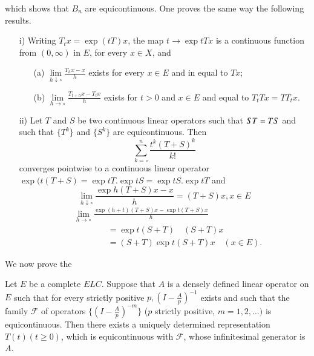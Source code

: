 which shows that $B_n$ are equicontinuous. One proves the same way the
following results. 
\begin{itemize}
\item [i)] Writing $T_tx=\exp (tT)x$, the map $t\to\exp tTx$ is a
  continuous function from $(0, \infty)$ in $E$, for every $x\in X$,
  and 
\begin{itemize}
\item [(a)] $\lim\limits_{h\downarrow\circ}\frac{T_hx-x}{h}$ exists
  for every $x\in E$ and in equal to $Tx$; 
\item [(b)] $\lim\limits_{h\to\circ}\frac{T_{t+h}x-T_tx}{h}$ exists for
  $t>0$ and $x\in E$ and equal to $T_tT x=TT_tx$.
\end{itemize}
\item [ii)] Let $T$ and $S$ be two continuous linear operators such
  that $ST=\break TS$ and such that $\{T^k\}$ and $\{S^k\}$ are
  equicontinuous. Then 
  $$\sum\limits_{k=\circ}^n \frac{t^k(T+S)^k}{k!}$$
  converges pointwise to a continuous linear operator $\exp (t(T+S)=
  \exp t T. \exp t S= \exp t S. \exp t T$ and 
$$
\lim\limits_{h\downarrow\circ}\frac{\exp h(T+S)x-x}{h}=(T+S)x, x\in E
$$\pageoriginale
\begin{align*}
&\lim\limits_{h\to\circ} \frac{\exp (h+t)(T+S)x-\exp t(T+S)x}{h}\\
&\qquad\qquad=\exp  t(S+T)\quad(S+T)x\\
&\qquad\qquad= (S+T)\exp t(S+T)x \quad (x\in E).
\end{align*}
\end{itemize}
We now prove the

 Let $E$ be a complete $E L
C$. Suppose that $A$ is a densely defined linear operator on $E$ such
that for every strictly positive $p,(I-\frac{A}{p})^{-1}$ exists and
such that the family $\mathscr{F}$ of operators
$\{(I-\frac{A}{p})^{-m}\}$ ($p$ strictly positive, $m=1, 2,\ldots)$ is
equicontinuous. Then there exists a uniquely determined representation
$T(t) (t\geq 0)$, which is equicontinuous with $\mathscr{F}$, whose
infinitesimal generator is $A$.

